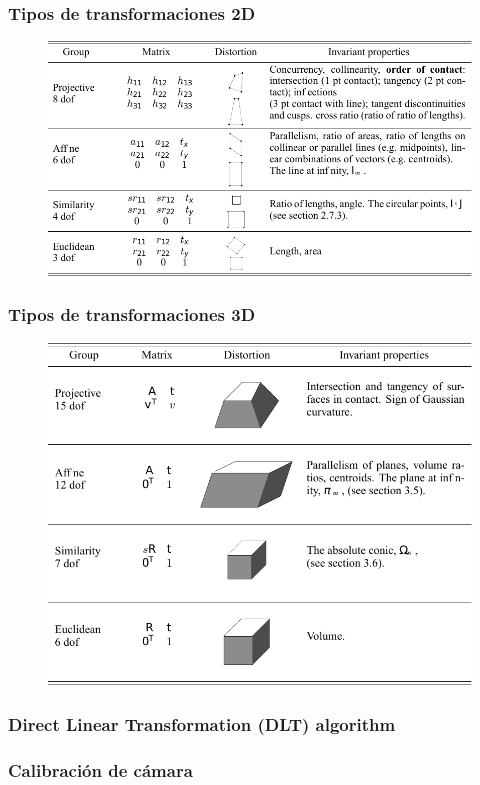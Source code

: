 \begin{frame}
	\frametitle{Tipos de transformaciones 2D}
	\footnotesize
	
	\begin{figure}
		\includegraphics[width=0.9\columnwidth]{./images/transformation_table_2d.pdf}
	\end{figure}
	
\end{frame}

\begin{frame}
	\frametitle{Tipos de transformaciones 3D}
	\footnotesize
	
	\begin{figure}
		\includegraphics[width=0.6\columnwidth]{./images/transformation_table_3d.pdf}
	\end{figure}
	
\end{frame}


\begin{frame}
    \frametitle{Direct Linear Transformation (DLT) algorithm}
    \footnotesize
    
\end{frame}



\begin{frame}
	\frametitle{Calibración de cámara}
	\footnotesize
	
	
\end{frame}



